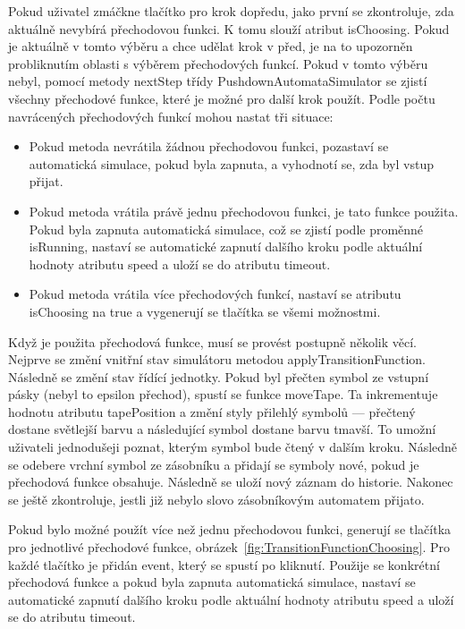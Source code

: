 Pokud uživatel zmáčkne tlačítko pro krok dopředu, jako první se zkontroluje, zda aktuálně nevybírá přechodovou funkci. K tomu slouží atribut isChoosing. Pokud je aktuálně v tomto výběru a chce udělat krok v před, je na to upozorněn probliknutím oblasti s výběrem přechodových funkcí. Pokud v tomto výběru nebyl, pomocí metody nextStep třídy PushdownAutomataSimulator se zjistí všechny přechodové funkce, které je možné pro další krok použít. Podle počtu navrácených přechodových funkcí mohou nastat tři situace:
\begin{itemize}
    \item Pokud metoda nevrátila žádnou přechodovou funkci, pozastaví se automatická simulace, pokud byla zapnuta, a vyhodnotí se, zda byl vstup přijat.
    \item  Pokud metoda vrátila právě jednu přechodovou funkci, je tato funkce použita. Pokud byla zapnuta automatická simulace, což se zjistí podle proměnné isRunning, nastaví se automatické zapnutí dalšího kroku podle aktuální hodnoty atributu speed a uloží se do atributu timeout.
    \item Pokud metoda vrátila více přechodových funkcí, nastaví se atributu isChoosing na true a vygenerují se tlačítka se všemi možnostmi.
\end{itemize}

Když je použita přechodová funkce, musí se provést postupně několik věcí. Nejprve se změní vnitřní stav simulátoru metodou applyTransitionFunction. Následně se změní stav řídící jednotky. Pokud byl přečten symbol ze vstupní pásky (nebyl to epsilon přechod), spustí se funkce moveTape. Ta inkrementuje hodnotu atributu tapePosition a změní styly přilehlý symbolů --- přečtený dostane světlejší barvu a následující symbol dostane barvu tmavší. To umožní uživateli jednodušeji poznat, kterým symbol bude čtený v dalším kroku. Následně se odebere vrchní symbol ze zásobníku a přidají se symboly nové, pokud je přechodová funkce obsahuje. Následně se uloží nový záznam do historie. Nakonec se ještě zkontroluje, jestli již nebylo slovo zásobníkovým automatem přijato.

Pokud bylo možné použít více než jednu přechodovou funkci, generují se tlačítka pro jednotlivé přechodové funkce, obrázek~\ref{fig:TransitionFunctionChoosing}. Pro každé tlačítko je přidán event, který se spustí po kliknutí. Použije se konkrétní přechodová funkce a pokud byla zapnuta automatická simulace, nastaví se automatické zapnutí dalšího kroku podle aktuální hodnoty atributu speed a uloží se do atributu timeout.

